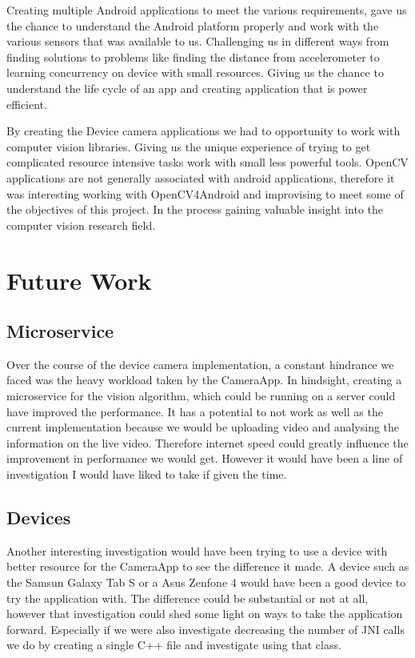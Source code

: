 Creating multiple Android applications to meet the various requirements, gave us the chance to understand the Android platform properly and work with the various sensors that was available to us. Challenging us in different ways from finding solutions to problems like finding the distance from accelerometer to learning concurrency on device with small resources. Giving us the chance to understand the life cycle of an app and creating application that is power efficient.

By creating the Device camera applications we had to opportunity to work with computer vision libraries. Giving us the unique experience of trying to get complicated resource intensive tasks work with small less powerful tools. OpenCV applications are not generally associated with android applications, therefore it was interesting working with OpenCV4Android and improvising to meet some of the objectives of this project. In the process gaining valuable insight into the computer vision research field.

\section{Future Work}

\subsection{Microservice}
Over the course of the device camera implementation, a constant hindrance we faced was the heavy workload taken by the CameraApp. In hindsight, creating a microservice for the vision algorithm, which could be running on a server could have improved the performance. It has a potential to not work as well as the current implementation because we would be uploading video and analysing the information on the live video. Therefore internet speed could greatly influence the improvement in performance we would get. However it would have been a line of investigation I would have liked to take if given the time.

\subsection{Devices}
Another interesting investigation would have been trying to use a device with better resource for the CameraApp to see the difference it made. A device such as the Samsun Galaxy Tab S or a Asus Zenfone 4 would have been a good device to try the application with. The difference could be substantial or not at all, however that investigation could shed some light on ways to take the application forward. Especially if we were also investigate decreasing the number of JNI calls we do by creating a single C++ file and investigate using that class.

